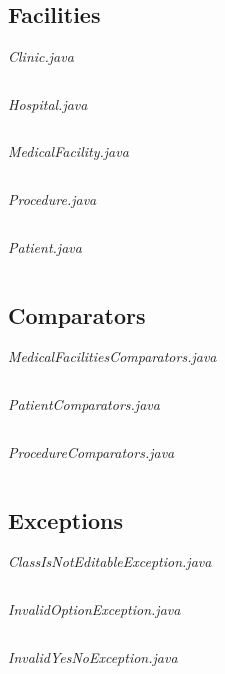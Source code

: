 \documentclass{article}
\begin{document}
	\subsection{Facilities}\label{sub:facilities} %
	\textit{Clinic.java}
	\inputminted{java}{src/main/java/com/yvesstraten/medicalconsole/facilities/Clinic.java}

	\textit{Hospital.java}
	\inputminted{java}{src/main/java/com/yvesstraten/medicalconsole/facilities/Hospital.java}

	\textit{MedicalFacility.java}
	\inputminted{java}{src/main/java/com/yvesstraten/medicalconsole/facilities/MedicalFacility.java}

	\textit{Procedure.java}
	\inputminted{java}{src/main/java/com/yvesstraten/medicalconsole/facilities/Procedure.java}

	\textit{Patient.java}
	\inputminted{java}{src/main/java/com/yvesstraten/medicalconsole/Patient.java}

	\subsection{Comparators}\label{sub:comparators} %
	\textit{MedicalFacilitiesComparators.java}
	\inputminted{java}{src/main/java/com/yvesstraten/medicalconsole/comparators/MedicalFacilitiesComparators.java}

	\textit{PatientComparators.java}
	\inputminted{java}{src/main/java/com/yvesstraten/medicalconsole/comparators/PatientComparators.java}

	\textit{ProcedureComparators.java}
	\inputminted{java}{src/main/java/com/yvesstraten/medicalconsole/comparators/ProcedureComparators.java}

  \newpage

	\subsection{Exceptions}\label{sub:exceptions} %
	\textit{ClassIsNotEditableException.java}
	\inputminted{java}{src/main/java/com/yvesstraten/medicalconsole/exceptions/ClassIsNotEditableException.java}

	\textit{InvalidOptionException.java}
	\inputminted{java}{src/main/java/com/yvesstraten/medicalconsole/exceptions/InvalidOptionException.java}

	\textit{InvalidYesNoException.java}
	\inputminted{java}{src/main/java/com/yvesstraten/medicalconsole/exceptions/InvalidYesNoException.java}
\end{document}
